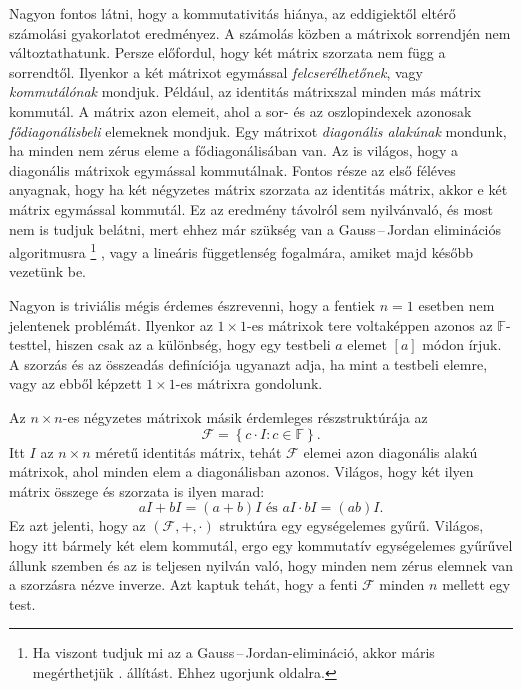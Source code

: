 \documentclass[a4paper, showtrims]{memoir}
\theoremstyle{plain}
\theoremstyle{remark}
\theoremstyle{definition}
\begin{document}
Nagyon fontos látni, hogy a kommutativitás hiánya, az eddigiektől eltérő számolási gyakorlatot eredményez.
A számolás közben a mátrixok sorrendjén nem változtathatunk.
Persze előfordul, hogy két mátrix szorzata nem függ a sorrendtől.
Ilyenkor a két mátrixot egymással \emph{felcserélhetőnek}, vagy \emph{kommutálónak} mondjuk.
Például, az identitás mátrixszal minden más mátrix kommutál.
A mátrix azon elemeit, ahol a sor- és az oszlopindexek azonosak
\emph{fődiagonálisbeli}
elemeknek mondjuk.
Egy mátrixot
\emph{diagonális alakúnak}
mondunk,
ha minden nem zérus eleme a fődiagonálisában van.
Az is világos, hogy a diagonális mátrixok egymással kommutálnak.
Fontos része az első féléves anyagnak, hogy ha két négyzetes mátrix szorzata az identitás mátrix,
akkor e két mátrix egymással kommutál.
Ez az eredmény távolról sem nyilvánvaló, és most nem is tudjuk belátni, mert ehhez már szükség van a Gauss\,--\,Jordan eliminációs algoritmusra%
\footnote{Ha viszont tudjuk mi az a Gauss\,--\,Jordan-elimináció, akkor máris megérthetjük . állítást. Ehhez ugorjunk \aazt{\pageref{pr:ketoldal}} oldalra.}
, vagy a lineáris függetlenség fogalmára, 
amiket majd később vezetünk be.\label{pg:kommutal}

Nagyon is triviális mégis érdemes észrevenni, hogy a fentiek $n=1$ esetben nem jelentenek problémát.
Ilyenkor az $1\times 1$-es mátrixok tere voltaképpen azonos az $\mathbb{F}$-testtel, hiszen csak az a különbség,
hogy egy testbeli $a$ elemet $[a]$ módon írjuk. A szorzás és az összeadás definíciója ugyanazt adja,
ha mint a testbeli elemre, vagy az ebből képzett $1\times 1$-es mátrixra gondolunk.

Az $n\times n$-es négyzetes mátrixok másik érdemleges részstruktúrája az
\[
	\mathcal{F}=
	\left\{ c\cdot I:c\in\mathbb{F} \right\}.
\]
Itt $I$ az $n\times n$ méretű identitás mátrix, tehát $\mathcal{F}$ elemei azon diagonális alakú mátrixok,
ahol minden elem a diagonálisban azonos.
Világos, hogy két ilyen mátrix összege és szorzata is ilyen marad:
\[
	aI+bI=\left( a+b \right)I\text{ és } aI\cdot bI=\left( ab \right)I.
\]
Ez azt jelenti, hogy az $\left( \mathcal{F},+,\cdot \right)$ struktúra egy egységelemes gyűrű.
Világos, hogy itt bármely két elem kommutál, ergo egy kommutatív egységelemes gyűrűvel állunk szemben és
az is teljesen nyilván való, hogy minden nem zérus elemnek van a szorzásra nézve inverze.
Azt kaptuk tehát, hogy a fenti $\mathcal{F}$ minden $n$ mellett egy test.
\end{document}
